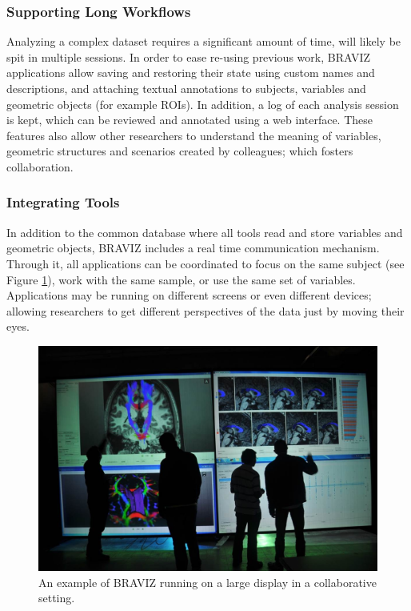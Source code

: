 \documentclass[twocolumn]{svjour3}
\begin{document}
\subsubsection{Supporting Long Workflows}

Analyzing a complex dataset requires a significant amount of time, will likely be spit in multiple sessions. In order to ease re-using previous work, BRAVIZ applications allow saving and restoring their state using custom names and descriptions, and attaching textual annotations to subjects, variables and geometric objects (for example ROIs). In addition, a log of each analysis session is kept, which can be reviewed and annotated using a web interface. These features also allow other researchers to understand the meaning of variables, geometric structures and scenarios created by colleagues; which fosters collaboration. 

\subsubsection{Integrating Tools}

In addition to the common database where all tools read and store variables and geometric objects, BRAVIZ includes a real time communication mechanism. Through it, all applications can be coordinated to focus on the same subject (see Figure \ref{fig_imagine}), work with the same sample, or use the same set of variables. Applications may be running on different screens or even different devices; allowing researchers to get different perspectives of the data just by moving their eyes.

\begin{figure}
\begin{center}
\includegraphics[width=\linewidth]{figures/imagine.jpg}
\end{center}
 \caption{\label{fig_imagine} An example of BRAVIZ running on a large display in a collaborative setting.}
\end{figure}
\end{document}
